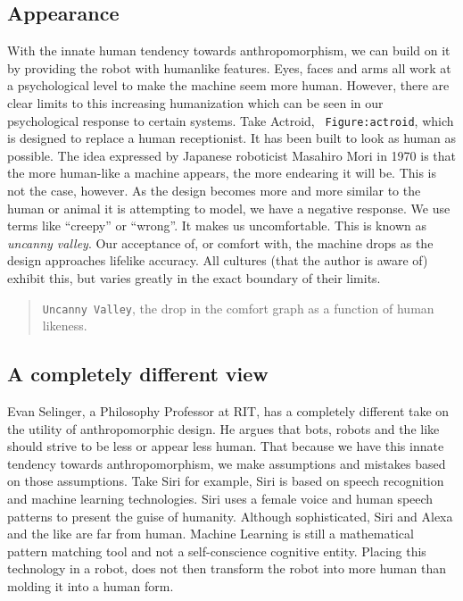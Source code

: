 \hypertarget{appearance}{%
\subsection{Appearance}\label{appearance}}

With the innate human tendency towards anthropomorphism, we can build on
it by providing the robot with humanlike features. Eyes, faces and arms
all work at a psychological level to make the machine seem more human.
However, there are clear limits to this increasing humanization which
can be seen in our psychological response to certain systems. Take
Actroid, ~\texttt{Figure:actroid}, which is designed to replace a human
receptionist. It has been built to look as human as possible. The idea
expressed by Japanese roboticist Masahiro Mori in 1970 is that the more
human-like a machine appears, the more endearing it will be. This is not
the case, however. As the design becomes more and more similar to the
human or animal it is attempting to model, we have a negative response.
We use terms like ``creepy'' or ``wrong''. It makes us uncomfortable.
This is known as \emph{uncanny valley}. Our acceptance of, or comfort
with, the machine drops as the design approaches lifelike accuracy. All
cultures (that the author is aware of) exhibit this, but varies greatly
in the exact boundary of their limits.

\begin{quote}
\texttt{Uncanny\ Valley}, the drop in the comfort graph as a function of
human likeness.
\end{quote}

\hypertarget{a-completely-different-view}{%
\subsection{A completely different
view}\label{a-completely-different-view}}

Evan Selinger, a Philosophy Professor at RIT, has a completely different
take on the utility of anthropomorphic design. He argues that bots,
robots and the like should strive to be less or appear less human. That
because we have this innate tendency towards anthropomorphism, we make
assumptions and mistakes based on those assumptions. Take Siri for
example, Siri is based on speech recognition and machine learning
technologies. Siri uses a female voice and human speech patterns to
present the guise of humanity. Although sophisticated, Siri and Alexa
and the like are far from human. Machine Learning is still a
mathematical pattern matching tool and not a self-conscience cognitive
entity. Placing this technology in a robot, does not then transform the
robot into more human than molding it into a human form.

